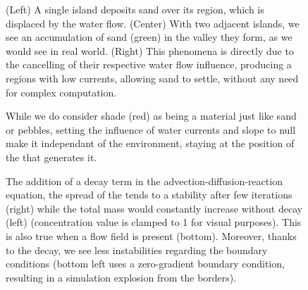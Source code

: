 \begin{figure}
    \caption{(Left) A single island deposits sand over its region, which is displaced by the water flow. (Center) With two adjacent islands, we see an accumulation of sand (green) in the valley they form, as we would see in real world. (Right) This phenomena is directly due to the cancelling of their respective water flow influence, producing a regions with low currents, allowing sand to settle, without any need for complex computation. }
    \label{fig:env-obj-double-island-sand-deposition}
\end{figure}

\begin{figure}
    \caption{While we do consider shade (red) as being a material just like sand or pebbles, setting the influence of water currents and slope to null make it independant of the environment, staying at the position of the  that generates it. }
    \label{fig:env-obj-shade}
\end{figure}

\begin{figure}[H]
    \centering
    \caption{The addition of a decay term in the advection-diffusion-reaction equation, the spread of the  tends to a stability after few iterations (right) while the total mass would constantly increase without decay (left) (concentration value is clamped to 1 for visual purposes). This is also true when a flow field is present (bottom). Moreover, thanks to the decay, we see less instabilities regarding the boundary conditions (bottom left uses a zero-gradient boundary condition, resulting in a simulation explosion from the borders). }
    \label{fig:env-obj-stability-examples}
\end{figure}



